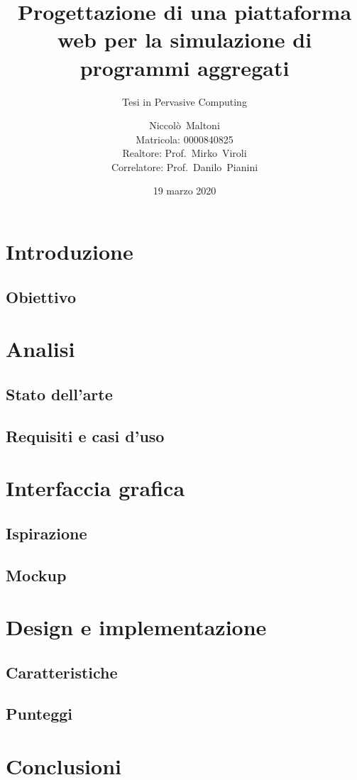 \documentclass[
  usepdftitle=false,  %
  bigger,               %
  lualatex,           %
  italian             %
]{beamer}
\title[%
  WebProtelis%
]{%
  Progettazione di una piattaforma web per la simulazione di programmi aggregati%
}
\subtitle{Tesi in Pervasive Computing}
\author[Niccolò~Maltoni (0000840825)]{%
  Niccolò~Maltoni%
  \\\small{Matricola: 0000840825}%
  \\\vspace{10pt} \small{Realtore: Prof.~Mirko~Viroli \\Correlatore: Prof.~Danilo~Pianini}
}
\institute[]{%
  Alma Mater Studiorum - Università di Bologna\\%
  Campus di Cesena%
}
\date{19 marzo 2020}
\begin{document}
  \frame{\titlepage}

  \section{Introduzione}
    \subsection{Obiettivo}

  \section{Analisi}
    \subsection{Stato dell'arte}
    \subsection{Requisiti e casi d'uso}

  \section{Interfaccia grafica}
    \subsection{Ispirazione}
    \subsection{Mockup}

  \section{Design e implementazione}
    \subsection{Caratteristiche}
    \subsection{Punteggi}

  \section{Conclusioni}

  \frame{\tableofcontents} %
\end{document}
